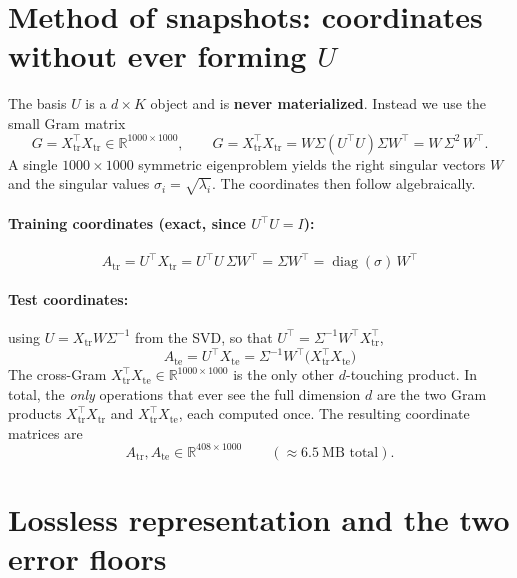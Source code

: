 \documentclass[11pt]{article}
\newcommand{\R}{\mathbb{R}}
\newcommand{\Xtr}{X_{\mathrm{tr}}}
\newcommand{\Xte}{X_{\mathrm{te}}}
\newcommand{\Atr}{A_{\mathrm{tr}}}
\newcommand{\Ate}{A_{\mathrm{te}}}
\DeclareMathOperator{\diag}{diag}
\begin{document}
\section{Method of snapshots: coordinates without ever forming \texorpdfstring{$U$}{U}}
The basis $U$ is a $d\times K$ object and is \textbf{never materialized}. Instead
we use the small Gram matrix
\begin{equation}
G = \Xtr^\top \Xtr \in \R^{1000\times1000},\qquad
G = \Xtr^\top\Xtr = W\Sigma(U^\top U)\Sigma W^\top = W\,\Sigma^2\,W^\top .
\end{equation}
A single $1000\times1000$ symmetric eigenproblem yields the right singular vectors
$W$ and the singular values $\sigma_i=\sqrt{\lambda_i}$. The coordinates then
follow algebraically.

\paragraph{Training coordinates (exact, since $U^\top U=I$):}
\begin{equation}
\boxed{\;\Atr = U^\top \Xtr = U^\top U\,\Sigma W^\top = \Sigma W^\top
      = \diag(\sigma)\,W^\top\;}
\end{equation}

\paragraph{Test coordinates:} using $U=\Xtr W\Sigma^{-1}$ from the SVD, so that
$U^\top=\Sigma^{-1}W^\top \Xtr^\top$,
\begin{equation}
\boxed{\;\Ate = U^\top \Xte = \Sigma^{-1} W^\top\bigl(\Xtr^\top \Xte\bigr)\;}
\end{equation}
The cross-Gram $\Xtr^\top \Xte \in \R^{1000\times1000}$ is the only other
$d$-touching product. In total, the \emph{only} operations that ever see the full
dimension $d$ are the two Gram products $\Xtr^\top\Xtr$ and $\Xtr^\top\Xte$, each
computed once. The resulting coordinate matrices are
\begin{equation}
\Atr,\Ate \in \R^{408\times1000}\qquad(\approx 6.5\ \text{MB total}).
\end{equation}

\section{Lossless representation and the two error floors}
\label{sec:floors}
\end{document}
